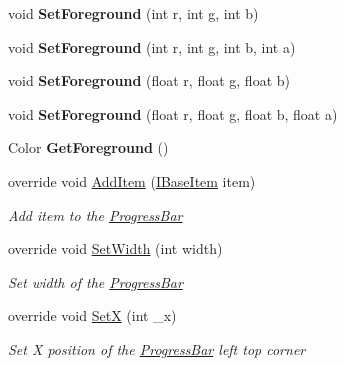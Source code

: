 \begin{DoxyCompactItemize}
\mbox{\label{class_space_v_i_l_1_1_progress_bar_a63f5661f820b5db78df71374f4d0162e}} 
void {\bfseries Set\+Foreground} (int r, int g, int b)
\item 
\mbox{\label{class_space_v_i_l_1_1_progress_bar_a5366fba9d281bd918d451c60f91f6365}} 
void {\bfseries Set\+Foreground} (int r, int g, int b, int a)
\item 
\mbox{\label{class_space_v_i_l_1_1_progress_bar_a49647fe88d72992e69ab50c86e64a160}} 
void {\bfseries Set\+Foreground} (float r, float g, float b)
\item 
\mbox{\label{class_space_v_i_l_1_1_progress_bar_a4fb9b7112f997d712647f3269200fc50}} 
void {\bfseries Set\+Foreground} (float r, float g, float b, float a)
\item 
\mbox{\label{class_space_v_i_l_1_1_progress_bar_ae484479a3f7a47c8b698095cdb684949}} 
Color {\bfseries Get\+Foreground} ()
\item 
override void \mbox{\hyperlink{class_space_v_i_l_1_1_progress_bar_a5948fb4d1ee63baefb2624c03262a01c}{Add\+Item}} (\mbox{\hyperlink{interface_space_v_i_l_1_1_core_1_1_i_base_item}{I\+Base\+Item}} item)
\begin{DoxyCompactList}\small\item\em Add item to the \mbox{\hyperlink{class_space_v_i_l_1_1_progress_bar}{Progress\+Bar}} \end{DoxyCompactList}\item 
override void \mbox{\hyperlink{class_space_v_i_l_1_1_progress_bar_af970d2e5eed12540914beb9978e25665}{Set\+Width}} (int width)
\begin{DoxyCompactList}\small\item\em Set width of the \mbox{\hyperlink{class_space_v_i_l_1_1_progress_bar}{Progress\+Bar}} \end{DoxyCompactList}\item 
override void \mbox{\hyperlink{class_space_v_i_l_1_1_progress_bar_a5ceeeefd0b4fb56ba6226d294e784a3e}{SetX}} (int \+\_\+x)
\begin{DoxyCompactList}\small\item\em Set X position of the \mbox{\hyperlink{class_space_v_i_l_1_1_progress_bar}{Progress\+Bar}} left top corner \end{DoxyCompactList}\item 

\end{DoxyCompactItemize}
